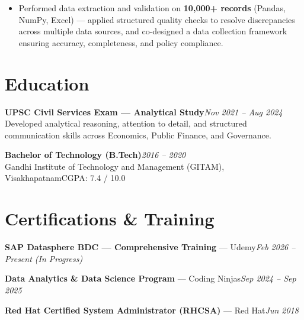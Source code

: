 \documentclass[10pt, letterpaper]{article}
\begin{document}
\begin{itemize}
  \item Performed data extraction and validation on \textbf{10,000+ records} (Pandas, NumPy, Excel) — applied structured quality checks to resolve discrepancies across multiple data sources, and co-designed a data collection framework ensuring accuracy, completeness, and policy compliance.
\end{itemize}


\section{Education}

{\bfseries UPSC Civil Services Exam — Analytical Study}\hfill{\small\color{muted}\textit{Nov 2021 – Aug 2024}}\\
{\small\color{muted}Developed analytical reasoning, attention to detail, and structured communication skills across Economics, Public Finance, and Governance.}

\vspace{2pt}
{\bfseries Bachelor of Technology (B.Tech)}\hfill{\small\color{muted}\textit{2016 – 2020}}\\
{\small\color{muted}Gandhi Institute of Technology and Management (GITAM), Visakhapatnam\hfill CGPA: 7.4 / 10.0}

\section{Certifications \& Training}

{\bfseries SAP Datasphere BDC — Comprehensive Training} — Udemy\hfill{\small\color{muted}\textit{Feb 2026 – Present \emph{(In Progress)}}}

\vspace{1pt}
{\bfseries Data Analytics \& Data Science Program} — Coding Ninjas\hfill{\small\color{muted}\textit{Sep 2024 – Sep 2025}}

\vspace{1pt}
{\bfseries Red Hat Certified System Administrator (RHCSA)} — Red Hat\hfill{\small\color{muted}\textit{Jun 2018}}

\end{document}

